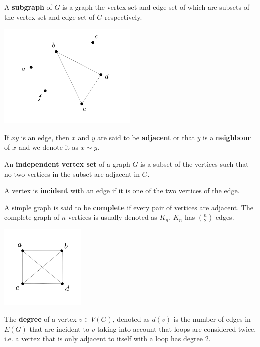 \documentclass[11pt]{article}
\theoremstyle{definition}
\begin{document}
A \textbf{subgraph} of $G$ is a graph the vertex set and edge set of which are subsets of the vertex set and edge set of $G$ respectively.

\begin{center}
    \centering
    \includegraphics[width=\textwidth, height=5cm, keepaspectratio=true]{images/subgraph.jpeg}
    \label{fig:subgraph}
\end{center}

If $xy$ is an edge, then $x$ and $y$ are said to be \textbf{adjacent} or that $y$ is a \textbf{neighbour} of $x$ and we denote it as $x \sim y$.

An \textbf{independent vertex set} of a graph $G$ is a subset of the vertices such that no two vertices in the subset are adjacent in $G$.

A vertex is \textbf{incident} with an edge if it is one of the two vertices of the edge. 

A simple graph is said to be \textbf{complete} if every pair of vertices are adjacent. The complete graph of $n$ vertices is usually denoted as $K_n$. $K_n$ has ${n \choose 2}$ edges.

\begin{center}
    \centering
    \includegraphics[width=\textwidth, height=4cm, keepaspectratio=true]{images/complete.jpeg}
    \label{fig:complete}
\end{center}

The \textbf{degree} of a vertex $v \in V(G)$, denoted as $d(v)$ is the number of edges in $E(G)$ that are incident to $v$ taking into account that loops are considered twice, i.e. a vertex that is only adjacent to itself with a loop has degree $2$.
\end{document}
